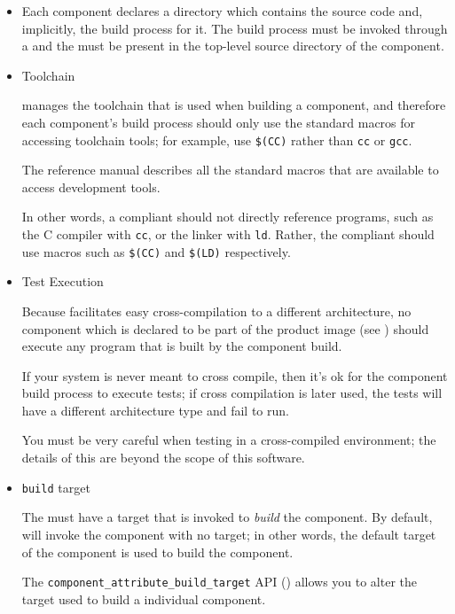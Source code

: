\begin{itemize}
\item \makefile

  Each component declares a directory which contains the source code
  and, implicitly, the build process for it.  The build process must
  be invoked through a \makefile and the \makefile must be present in
  the top-level source directory of the component.

\item Toolchain

  \lmsbw manages the toolchain that is used when building a component,
  and therefore each component's build process should only use the
  standard macros for accessing toolchain tools; for example, use
  \texttt{\$(CC)} rather than \texttt{cc} or \texttt{gcc}.

  The \gnumake reference manual describes all the standard macros that
  are available to access development tools.

  In other words, a compliant \makefile should not directly reference
  programs, such as the C compiler with \texttt{cc}, or the linker
  with \texttt{ld}.  Rather, the compliant \makefile should use macros
  such as \texttt{\$(CC)} and \texttt{\$(LD)} respectively.

\item Test Execution

  Because \lmsbw facilitates easy cross-compilation to a different
  architecture, no component which is declared to be part of the
  product image (see ) should execute any
  program that is built by the component build.

  If your system is never meant to cross compile, then it's ok for the
  component build process to execute tests; if cross compilation is
  later used, the tests will have a different architecture type and
  fail to run.

  You must be very careful when testing in a cross-compiled
  environment; the details of this are beyond the scope of this
  software.

\item \texttt{build} target

  The \makefile must have a target that is invoked to \emph{build} the
  component.  By default, \lmsbw will invoke the component \makefile
  with no target; in other words, the default target of the component
  \makefile is used to build the component.

  The \texttt{component\_attribute\_build\_target} API
  () allows you to alter
  the target used to build a individual component.


\end{itemize}
